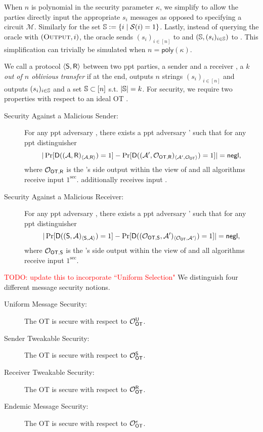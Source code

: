 \begin{remark}
	When $n$ is polynomial in the security parameter $\kappa$, we simplify  to allow the parties directly input the appropriate $s_i$ messages as opposed to specifying a circuit $\mathcal{M}$. Similarly for the set $\mathsf{\mathbb S}:=\{i \mid \mathcal{S}(i)=1\}$. Lastly, instead of querying the oracle with $(\textsc{Output}, i)$, the oracle sends $(s_i)_{i\in [n]}$ to \send and $(\mathsf{\mathbb S}, (s_i)_{i\in\mathsf{\mathbb S}})$ to \rec. This simplification can trivially be simulated when $n=\textsf{poly}(\kappa)$.
\end{remark}




\begin{definition}\label{def:otSec}
We call a protocol $\langle \mathsf{S},\mathsf{R} \rangle$ between two ppt parties, a sender \send and a receiver \rec, a \emph{$k$ out of $n$ oblivious transfer} if %
at the end, \send outputs $n$ strings $(s_i)_{i\in[n]}$ and \rec outputs $(s_i)_{i\in\mathsf{\mathbb S}}$ and a set $\mathsf{\mathbb S}\subset[n]$ s.t. $|\mathsf{\mathbb S}|=k$. For security, we require two properties with respect to an ideal OT \OOT.
\begin{description}
\item[Security Against a Malicious Sender:] For any ppt adversary \Adv, there exists a ppt adversary \Adv' such that for any ppt distinguisher \D
$$
|\Pr[\mathsf D((\mathcal{A},\mathsf{R})_{\langle \mathcal{A}, \mathsf{R}\rangle})=1] -\Pr[\mathsf D( (\mathcal{A}', \mathcal{O}_{\mathsf{OT}, \mathsf{R}})_{\langle \mathcal{A}', \mathcal{O}_{\mathsf{OT}}\rangle})=1]|=\mathsf{negl},
$$
where $\mathcal{O}_{\mathsf{OT}, \mathsf{R}}$ is the \rec's side output within the view of \OOT and all algorithms receive input $1^\sec$. \rec additionally receives input \set.
\item[Security Against a Malicious Receiver:] For any ppt adversary \Adv, there exists a ppt adversary \Adv' such that for any ppt distinguisher \D
$$
|\Pr[\mathsf D((\mathsf{S}, \mathcal{A})_{\langle \mathsf{S}, \mathcal{A}\rangle})=1] -\Pr[\mathsf D((\mathcal{O}_{\mathsf{OT},\mathsf{S}},\mathcal{A}')_{\langle \mathcal{O}_{\mathsf{OT}} , \mathcal{A}' \rangle})=1]|=\mathsf{negl},
$$
where $\mathcal{O}_{\mathsf{OT},\mathsf{S}}$ is  the \send's side output within the view of \OOT and all algorithms receive input $1^\sec$.
\end{description}


\textcolor{red}{TODO: update this to incorporate ``Uniform Selection"} We distinguish four different message security notions.
\begin{description}
\item[Uniform Message Security:] The OT is secure with respect to $\mathcal{O}_{\mathsf{OT}}^\mathsf{U}$.
\item[Sender Tweakable Security:] The OT is secure with respect to $\mathcal{O}_{\mathsf{OT}}^{\mathsf{S}}$.
\item[Receiver Tweakable Security:] The OT is secure with respect to $\mathcal{O}_{\mathsf{OT}}^{\mathsf{R}}$.
\item[Endemic Message Security:] The OT is secure with respect to $\mathcal{O}_{\mathsf{OT}}^{e}$.
\end{description}


\end{definition}

